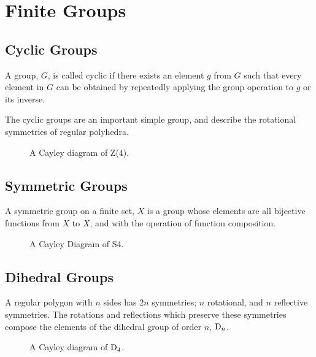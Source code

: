 \documentclass[]{dwnotes}
\begin{document}
\section{Finite Groups}
\label{sec:finiteexamples}

\subsection{Cyclic Groups}
\label{sec:cyclicgroups}

\begin{definition}
  A group, $G$, is called cyclic if there exists an element $g$ from
  $G$ such that every element in $G$ can be obtained by repeatedly
  applying the group operation to $g$ or its inverse.
\end{definition}
The cyclic groups are an important simple group, and describe the
rotational symmetries of regular polyhedra.
\begin{figure}
  \centering
  \caption{A Cayley diagram of Z(4).}
  \label{fig:cayleycyclic}
\end{figure}

\subsection{Symmetric Groups}
\label{sec:symmetricgroups}

\begin{definition}
  A symmetric group on a finite set, $X$ is a group whose elements are all bijective functions from $X$ to $X$, and with the operation of function composition.
\end{definition}
\begin{figure}
  \centering
  \caption{A Cayley Diagram of S4.}
  \label{fig:cayleysymmetric}
\end{figure}

\subsection{Dihedral Groups}
\label{sec:dihedralgroups}

\begin{definition}
  A regular polygon with $n$ sides has $2n$ symmetries; $n$
  rotational, and $n$ reflective symmetries. The rotations and
  reflections which preserve these symmetries compose the elements of the dihedral group of order $n$, ${\rm D}_n$.
\end{definition}
\begin{figure}
  \centering
  \caption{A Cayley diagram of ${\rm D}_4$.}
  \label{fig:cayleydihedral}
\end{figure}
\end{document}

